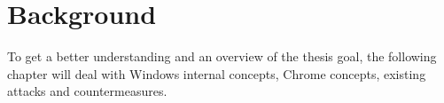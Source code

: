 \section{Background}
\label{sec:background}
To get a better understanding and an overview of the thesis goal, the following chapter will deal with Windows internal concepts, Chrome concepts, existing attacks and countermeasures.




